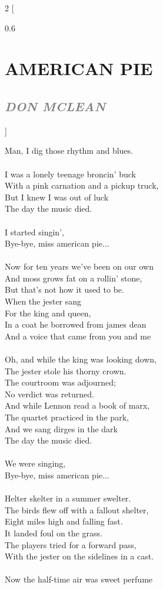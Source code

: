 \documentclass[100pt,a4paper]{report}
\newenvironment{song2}[2]
	{	
    	\begin{multicols*}{2}
		[
			\begin{spacing}{0.6}
				\section*{\LARGE\centering \MakeUppercase{\textbf{{#1}}}}
				\subsection*{\Large\centering \textit{\textcolor{gray}{\MakeUppercase{{#2}}}}}
			\end{spacing}
		]
		\Large
	}
	{
	\end{multicols*}
	\newpage
    }
\begin{document}
\begin{song2}{American Pie}{Don McLean}
Man, I dig those rhythm and blues.\\
\\
I was a lonely teenage broncin' buck\\
With a pink carnation and a pickup truck,\\
But I knew I was out of luck\\
The day the music died.\\
\\
I started singin',\\
Bye-bye, miss american pie...\\
\\
Now for ten years we've been on our own\\
And moss grows fat on a rollin' stone,\\
But that's not how it used to be.\\
When the jester sang\\ 
For the king and queen,\\
In a coat he borrowed from james dean\\
And a voice that came from you and me\\
\\
Oh, and while the king was looking down,\\
The jester stole his thorny crown.\\
The courtroom was adjourned;\\
No verdict was returned.\\
And while Lennon read a book of marx,\\
The quartet practiced in the park,\\
And we sang dirges in the dark\\
The day the music died.\\
\\
We were singing,\\
Bye-bye, miss american pie...\\
\\
Helter skelter in a summer swelter.\\
The birds flew off with a fallout shelter,\\
Eight miles high and falling fast.\\
It landed foul on the grass.\\
The players tried for a forward pass,\\
With the jester on the sidelines in a cast.\\
\\
Now the half-time air was sweet perfume\\

\end{song2}
\end{document}
